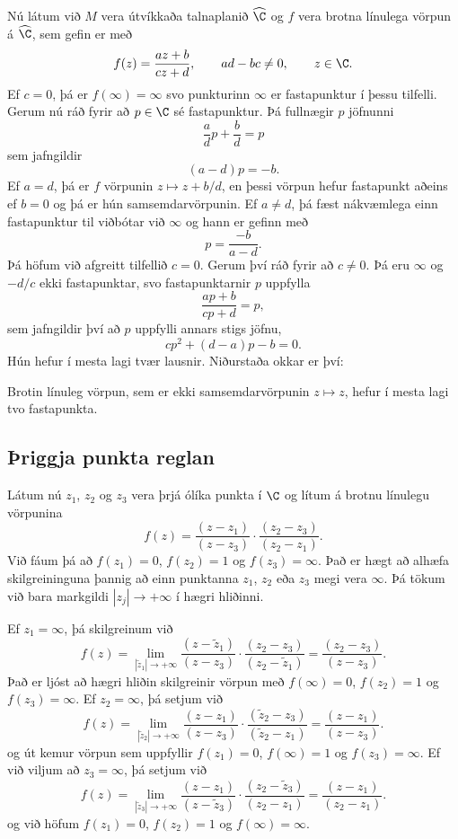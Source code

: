 Nú látum við $M$ vera útvíkkaða talnaplanið $\widehat \C$ og $f$ vera
brotna línulega vörpun á $\widehat \C$, sem gefin er með
$$
f(z)=\dfrac{az+b}{cz+d}, \qquad ad-bc\neq 0, \qquad z\in \C.
$$
Ef $c=0$, þá er $f(\infty)=\infty$ svo punkturinn $\infty$ er
fastapunktur í þessu tilfelli.  Gerum nú ráð fyrir að $p\in \C$ sé
fastapunktur. Þá fullnægir $p$ jöfnunni
$$
\dfrac ad p+\dfrac bd=p 
$$
sem jafngildir 
$$
(a-d)p=-b.
$$
Ef $a=d$, þá er $f$ vörpunin $z\mapsto z+b/d$, en þessi vörpun hefur
fastapunkt aðeins ef $b=0$ og  þá er hún samsemdarvörpunin.
Ef $a\neq d$, þá fæst nákvæmlega einn fastapunktur til viðbótar við
$\infty$ og hann er gefinn með
$$
p=\dfrac {-b}{a-d}.
$$
Þá höfum við afgreitt tilfellið $c=0$.  Gerum því ráð fyrir að $c\neq
0$.  Þá eru $\infty$ og $-d/c$ ekki fastapunktar, svo fastapunktarnir
$p$ uppfylla 
$$
\dfrac{ap+b}{cp+d}=p,
$$
sem jafngildir því að $p$ uppfylli annars stigs jöfnu,
$$
cp^2+(d-a)p-b=0.
$$
Hún hefur í mesta lagi tvær lausnir.  Niðurstaða okkar er því:

\begin{se}\label{se:fastapunktar}
Brotin línuleg vörpun, sem er ekki samsemdarvörpunin $z\mapsto z$,
hefur í mesta lagi tvo fastapunkta. 
\end{se}

\subsection*{Þriggja punkta reglan}

Látum nú $z_1$, $z_2$ og $z_3$ vera þrjá ólíka punkta í $\C$ og lítum
á brotnu línulegu vörpunina
$$
f(z)=\dfrac{(z-z_1)}{(z-z_3)}\cdot \dfrac{(z_2-z_3)}{(z_2-z_1)}.
$$
Við fáum þá að $f(z_1)=0$, $f(z_2)=1$ og $f(z_3)=\infty$.   Það er
hægt að alhæfa skilgreininguna þannig að einn punktanna $z_1$, $z_2$
eða $z_3$ megi vera $\infty$.  Þá tökum við bara markgildi $|z_j|\to
+\infty$ í hægri hliðinni.    

Ef $z_1=\infty$, þá skilgreinum við
$$
f(z)=\lim_{|\tilde z_1|\to+\infty}
\dfrac{(z-\tilde z_1)}{(z-z_3)}\cdot \dfrac{(z_2-z_3)}{(z_2-\tilde
z_1)}
=\dfrac {(z_2-z_3)}{(z-z_3)}.
$$
Það er ljóst að hægri hliðin skilgreinir vörpun með
$f(\infty)=0$, $f(z_2)=1$ og $f(z_3)=\infty$.
Ef $z_2=\infty$, þá setjum við 
$$
f(z)=\lim_{|\tilde z_2|\to+\infty}
\dfrac{(z-z_1)}{(z-z_3)}\cdot \dfrac{(\tilde z_2-z_3)}{(\tilde z_2-
z_1)}
=\dfrac {(z-z_1)}{(z-z_3)}.
$$
og út kemur vörpun sem uppfyllir $f(z_1)=0$, $f(\infty)=1$ og
$f(z_3)=\infty$.  Ef við viljum að $z_3=\infty$, þá setjum við
$$
f(z)=\lim_{|\tilde z_3|\to+\infty}
\dfrac{(z-z_1)}{(z-\tilde z_3)}\cdot \dfrac{( z_2-\tilde z_3)}{(z_2-
z_1)}
=\dfrac {(z-z_1)}{(z_2-z_1)}.
$$
og við höfum $f(z_1)=0$, $f(z_2)=1$ og $f(\infty)=\infty$.


